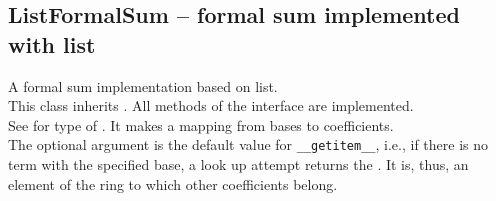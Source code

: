  \subsection{ListFormalSum -- formal sum implemented with list}
   A formal sum implementation based on list.\\
  \spacing
  \quad This class inherits .
  All methods of the interface are implemented.
 \initialize
  \\
  \spacing
  \quad See  for type of .
  It makes a mapping from bases to coefficients.\\
  \quad The optional argument  is the default value for
  {\tt \_\_getitem\_\_}, i.e., if there is no term with the specified
  base, a look up attempt returns the .  It is,
  thus, an element of the ring to which other coefficients belong.
\C


